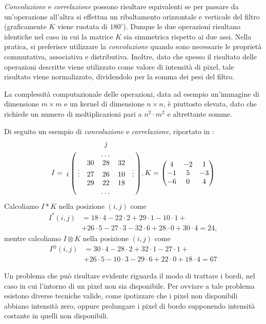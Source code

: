 \textit{Convoluzione} e \textit{correlazione} possono risultare equivalenti se per passare da un'operazione all'altra si effettua un ribaltamento orizzontale e verticale del filtro (graficamente $K$ viene ruotata di $180^{\circ}$). Dunque le due operazioni risultano identiche nel caso in cui la matrice $K$ sia simmetrica rispetto ai due assi. Nella pratica, si preferisce utilizzare la \textit{convoluzione} quando sono necessarie le propriet\`a commutativa, associativa e distributiva. Inoltre, dato che spesso il risultato delle operazioni descritte viene utilizzato come valore di intensit\`a di pixel, tale risultato viene normalizzato, dividendolo per la somma dei pesi del filtro.\par
La complessit\`a computazionale delle operazioni, data ad esempio un'immagine di dimensione $m\times m$ e un kernel di dimensione $n\times n$, \`e piuttosto elevata, dato che richiede un numero di moltiplicazioni pari a $n^{2}\cdot m^{2}$ e altrettante somme.\par
Di seguito un esempio di \textit{convoluzione} e \textit{correlazione}, riportato in \cite{bib:convolution}:
$$
I=\bordermatrix{
		& & & j & & \cr
        & & & \dots & & \cr
		& & 30 & 28 & 32 & \cr
		i & \vdots & 27 & 26 & 10 & \vdots \cr
		& & 29 & 22 & 18 & \cr
		& & & \dots & & \cr
	},
K=\begin{pmatrix} 
	4 & -2 & 1 \\
	-1 & 5 & -3\\
	-6 & 0 & 4
\end{pmatrix}
$$
Calcoliamo $I * K$ nella posizione $(i, j)$ come 
\begin{equation}
	\label{eq:convolution-example}
	\begin{split}
		I^{*}(i, j) & = 18\cdot 4 - 22\cdot 2 + 29\cdot 1 - 10\cdot 1+\\ 
		& + 26\cdot 5 -27\cdot 3 - 32\cdot 6 + 28\cdot 0 + 30\cdot 4 = 24,
	\end{split}
\end{equation}
mentre calcoliamo $I \otimes K$ nella posizione $(i, j)$ come 
\begin{equation}
	\label{eq:correlation-example}
	\begin{split}
		I^{\otimes}(i, j) & = 30\cdot 4 - 28\cdot 2 + 32\cdot 1 - 27\cdot 1+\\
		& + 26\cdot 5 -10\cdot 3 - 29\cdot 6 + 22\cdot 0 + 18\cdot 4 = 67
	\end{split}
\end{equation}\par
Un problema che pu\`o risultare evidente riguarda il modo di trattare i bordi, nel caso in cui l'intorno di un pixel non sia disponibile. Per ovviare a tale problema esistono diverse tecniche valide, come ipotizzare che i pixel non disponibili abbiano intensit\`a zero, oppure prolungare i pixel di bordo supponendo intensit\`a costante in quelli non disponibili.\par
